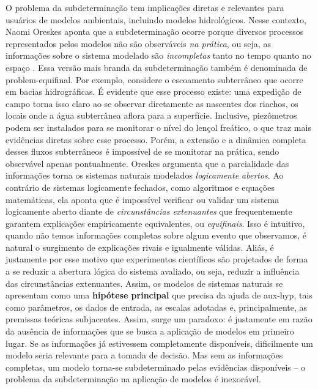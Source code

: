 \documentclass[./main.tex]{subfiles}
\begin{document}
\par O problema da subdeterminação tem implicações diretas e relevantes para usuários de modelos ambientais, incluindo modelos hidrológicos. Nesse contexto, Naomi Oreskes aponta que a subdeterminação ocorre porque diversos processos representados pelos modelos não são observáveis \textit{na prática}, ou seja, as informações sobre o sistema modelado são \textit{incompletas} tanto no tempo quanto no espaço \cite{Oreskes1994}. Essa versão mais branda da subdeterminação também é denominada de \gls{problem-equifinal}\cite{Beven2006}. Por exemplo, considere o escoamento subterrâneo que ocorre em bacias hidrográficas. É evidente que esse processo existe: uma expedição de campo torna isso claro ao se observar diretamente as nascentes dos riachos, os locais onde a água subterrânea aflora para a superfície. Inclusive, piezômetros podem ser instalados para se monitorar o nível do lençol freático, o que traz mais evidências diretas sobre esse processo. Porém, a extensão e a dinâmica completa desses fluxos subterrâneos é impossível de se monitorar na prática, sendo observável apenas pontualmente. Oreskes argumenta que a parcialidade das informações torna os sistemas naturais modelados \textit{logicamente abertos}. Ao contrário de sistemas logicamente fechados, como algoritmos e equações matemáticas, ela aponta que é impossível verificar ou validar um sistema logicamente aberto diante de \textit{circunstâncias extenuantes} que frequentemente garantem explicações empiricamente equivalentes, ou \textit{equifinais}. Isso é intuitivo, quando não temos informações completas sobre algum evento que observamos, é natural o surgimento de explicações rivais e igualmente válidas. Aliás, é justamente por esse motivo que experimentos científicos são projetados de forma a se reduzir a abertura lógica do sistema avaliado, ou seja, reduzir a influência das circunstâncias extenuantes. Assim, os modelos de sistemas naturais se apresentam como uma \textbf{hipótese principal} que precisa da ajuda de \gls{aux-hyp}, tais como parâmetros, os dados de entrada, as escalas adotadas e, principalmente, as premissas teóricas subjacentes. Assim, surge um paradoxo: é justamente em razão da ausência de informações que se busca a aplicação de modelos em primeiro lugar. Se as informações já estivessem completamente disponíveis, dificilmente um modelo seria relevante para a tomada de decisão. Mas sem as informações completas, um modelo torna-se subdeterminado pelas evidências disponíveis -- o problema da subdeterminação na aplicação de modelos é inexorável.
\end{document}
